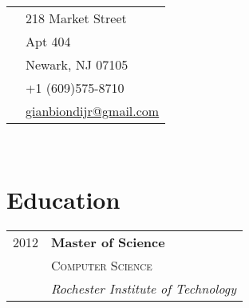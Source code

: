 \documentclass[10pt]{article} %
\begin{document}
{\begin{minipage}[t]{0.5\textwidth}

\end{minipage} %
\hfill
\begin{minipage}[t]{0.44\textwidth} %
\vspace{0pt} %


\colorbox{shade}{\textcolor{text1}{
  \begin{tabular}{c|p{7cm}}
    \raisebox{-4pt}{\textifsymbol{18}} 
      & 218 Market Street \\
      & Apt 404 \\
      & Newark, NJ 07105 \\ %
    \raisebox{-3pt}{\Mobilefone} 
      & +1 (609)575-8710 \\ %
    \raisebox{-1pt}{\Letter} 
      & \href{mailto:gianbiondijr@gmail.com}{gianbiondijr@gmail.com} \\ %
  \end{tabular}
}}\\[10pt]


\section{Education} 

\begin{tabular}{rl} %


2012 & \textbf{Master of Science} \\
& \textsc{Computer Science} \\ 
& \textit{Rochester Institute of Technology}\\
 

\end{tabular}
\end{minipage}}
\end{document}
